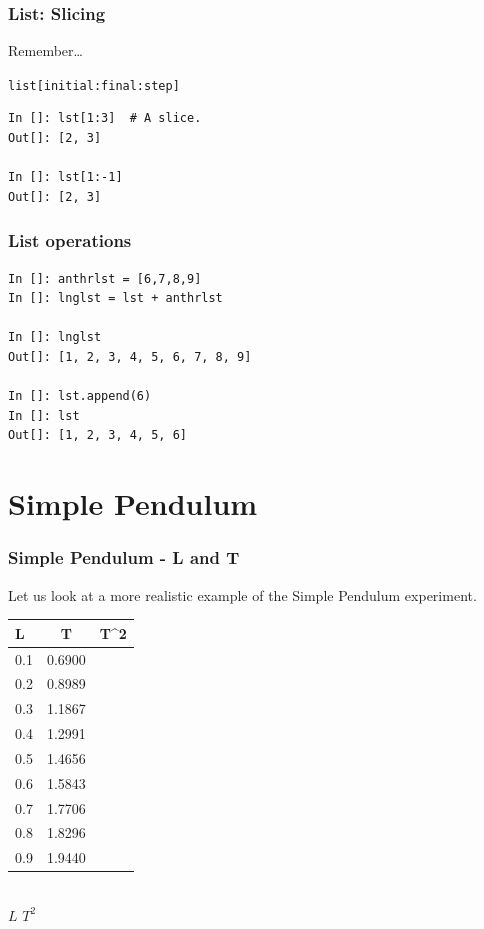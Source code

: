 \documentclass[14pt,compress]{beamer}
\newcounter{time}
\newcommand{\inctime}[1]{\addtocounter{time}{#1}{\tiny \thetime\ m}}
\newcommand{\typ}[1]{\lstinline{#1}}
\newcommand{\kwrd}[1]{ \texttt{\textbf{\color{blue}{#1}}}  }
\begin{document}
\begin{frame}[fragile]
  \frametitle{List: Slicing}
  \begin{block}{Remember\ldots}
	\kwrd{In []: lst = [1,2,3,4,5]}
  \end{block}
\alert{\typ{list[initial:final:step]}}
\begin{lstlisting}
In []: lst[1:3]  # A slice.
Out[]: [2, 3]

In []: lst[1:-1]
Out[]: [2, 3]
\end{lstlisting}
\end{frame}

\begin{frame}[fragile]
  \frametitle{List operations}
\begin{lstlisting}
In []: anthrlst = [6,7,8,9]
In []: lnglst = lst + anthrlst

In []: lnglst
Out[]: [1, 2, 3, 4, 5, 6, 7, 8, 9]

In []: lst.append(6)
In []: lst
Out[]: [1, 2, 3, 4, 5, 6]
\end{lstlisting}
\end{frame}

\section{Simple Pendulum}
\begin{frame}[fragile]
\frametitle{Simple Pendulum - L and T}
Let us look at a more realistic example of the Simple Pendulum experiment.
\begin{center}
\begin{small}
\begin{tabular}{| l | c | r |}
\hline
L & T & T^2 \\ \hline
0.1 & 0.6900 & \\ \hline
0.2 & 0.8989 & \\ \hline
0.3 & 1.1867 & \\ \hline
0.4 & 1.2991 & \\ \hline
0.5 & 1.4656 & \\ \hline
0.6 & 1.5843 & \\ \hline
0.7 & 1.7706 & \\ \hline
0.8 & 1.8296 & \\ \hline
0.9 & 1.9440 & \\ \hline
\end{tabular}
\end{small}\\
\alert{$L$ \alpha $T^2$}
\end{center}
\end{frame}
\end{document}
